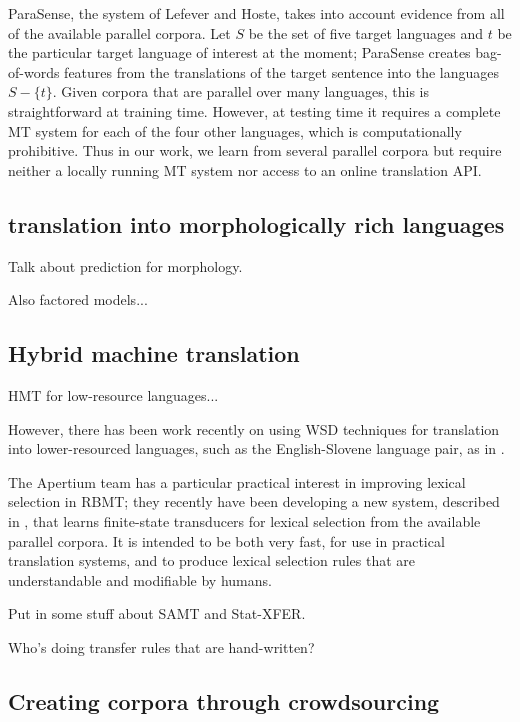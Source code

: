 ParaSense, the system of Lefever
and Hoste, takes into account evidence from all of the available parallel
corpora. Let $S$ be the set of five target languages and $t$ be the particular
target language of interest at the moment; ParaSense creates bag-of-words
features from the translations of the target sentence into the languages $S -
\lbrace{t \rbrace}$.
Given corpora that are parallel over many languages, this is straightforward at
training time. However, at testing time it requires a complete MT system for
each of the four other languages, which is computationally prohibitive. Thus in
our work, we learn from several parallel corpora but require neither a locally
running MT system nor access to an online translation API.


\subsection{translation into morphologically rich languages}

Talk about prediction for morphology.
\cite{toutanova-suzuki-ruopp:2008:ACLMain}

Also factored models...

\subsection{Hybrid machine translation}
HMT for low-resource languages...

However, there has been work recently on using WSD techniques for translation
into lower-resourced languages, such as the English-Slovene language pair, as
in \cite{vintar-fivser-vrvsvcaj:2012:ESIRMT-HyTra2012}. 

The Apertium team has a particular practical interest in improving lexical
selection in RBMT; they recently have been developing
a new system, described in \cite{tyers-fst}, that learns finite-state
transducers for lexical selection from the available parallel corpora. It is
intended to be both very fast, for use in practical translation systems, and
to produce lexical selection rules that are understandable and modifiable by
humans.

Put in some stuff about SAMT and Stat-XFER.

Who's doing transfer rules that are hand-written?

\subsection{Creating corpora through crowdsourcing}

